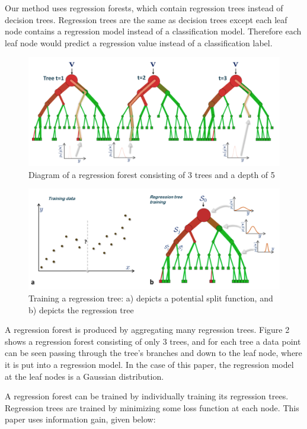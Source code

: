 Our method uses regression forests, which contain regression trees instead of decision trees. Regression trees are the same as decision trees except each leaf node contains a regression model instead of a classification model. Therefore each leaf node would predict a regression value instead of a classification label.

\begin{figure}
\includegraphics[scale=0.45]{regressionforest.png}
\caption{Diagram of a regression forest consisting of 3 trees and a depth of 5}
\end{figure}

\begin{figure}
\includegraphics[scale=0.45]{regressiontraining.png}
\caption{Training a regression tree: a) depicts a potential split function, and b) depicts the regression tree}
\end{figure}

A regression forest is produced by aggregating many regression trees. Figure 2 shows a regression forest consisting of only 3 trees, and for each tree a data point can be seen passing through the tree's branches and down to the leaf node, where it is put into a regression model. In the case of this paper, the regression model at the leaf nodes is a Gaussian distribution.
  
A regression forest can be trained by individually training its regression trees. Regression trees are trained by minimizing some loss function at each node. This paper uses information gain, given below:

